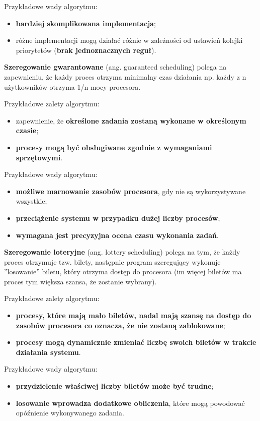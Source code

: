 \documentclass{article}
\begin{document}
Przykładowe wady algorytmu:
\begin{itemize}
    \item \textbf{bardziej skomplikowana implementacja};
    \item różne implementacji mogą działać różnie w zależności od ustawień kolejki priorytetów (\textbf{brak jednoznacznych reguł}).
\end{itemize}

\textbf{Szeregowanie gwarantowane} (ang. guaranteed scheduling) polega na zapewnieniu, że każdy proces otrzyma minimalny czas działania np. każdy z n użytkowników otrzyma 1/n mocy procesora.

Przykładowe zalety algorytmu:
\begin{itemize}
    \item zapewnienie, że \textbf{określone zadania zostaną wykonane w określonym czasie};
    \item \textbf{procesy mogą być obsługiwane zgodnie z wymaganiami sprzętowymi}.
\end{itemize}

Przykładowe wady algorytmu:
\begin{itemize}
    \item \textbf{możliwe marnowanie zasobów procesora}, gdy nie są wykorzystywane wszystkie;
    \item \textbf{przeciążenie systemu w przypadku dużej liczby procesów}; 
    \item \textbf{wymagana jest precyzyjna ocena czasu wykonania zadań}.
\end{itemize}

\textbf{Szeregowanie loteryjne} (ang. lottery scheduling) polega na tym, że każdy proces otrzymuje tzw. bilety, następnie program szeregujący wykonuje ”losowanie” biletu, który otrzyma dostęp do procesora (im więcej biletów ma proces tym większa szansa, że zostanie wybrany).

Przykładowe zalety algorytmu:
\begin{itemize}
    \item \textbf{procesy, które mają mało biletów, nadal mają szansę na dostęp do zasobów procesora co oznacza, że nie zostaną zablokowane};
    \item \textbf{procesy mogą dynamicznie zmieniać liczbę swoich biletów w trakcie działania systemu}.
\end{itemize}

Przykładowe wady algorytmu:
\begin{itemize}
    \item \textbf{przydzielenie właściwej liczby biletów może być trudne};
    \item \textbf{losowanie wprowadza dodatkowe obliczenia}, które mogą powodować opóźnienie wykonywanego zadania.
\end{itemize}
\end{document}
